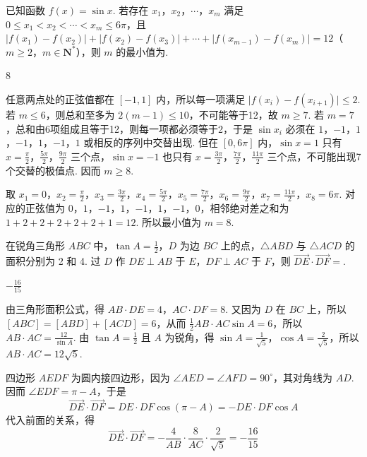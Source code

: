 \begin{problem}
已知函数 \( f(x) = \sin x \). 若存在 \(x_1\)，\(x_2\)，\(\cdots\)，\(x_m\) 满足 \( 0 \leqslant x_1 < x_2 < \cdots < x_m \leqslant 6\pi \)，且 \( |f(x_1) - f(x_2)| + |f(x_2) - f(x_3)| + \cdots + |f(x_{m-1}) - f(x_m)| = 12  \)（\(m \geqslant 2\)，\(m \in \mathbf{N}^*\)），则 \( m \) 的最小值为\fillinblank{}.
\end{problem}

\begin{answer}
8
\end{answer}

\begin{solution}
任意两点处的正弦值都在 \([-1,1]\) 内，所以每一项满足 \(\lvert f(x_i)-f(x_{i+1})\rvert\leqslant2\). 若 \(m\leqslant6\)，则总和至多为 \(2(m-1)\leqslant10\)，不可能等于12，故 \(m\geqslant7\). 若 \(m=7\)，总和由6项组成且等于12，则每一项都必须等于2，于是 \(\sin x_i\) 必须在 \(1\)，\(-1\)，\(1\)，\(-1\)，\(1\)，\(-1\)，\(1\) 或相反的序列中交替出现. 但在 \([0,6\pi]\) 内，\(\sin x=1\) 只有 \(x=\frac\pi2\)，\(\frac{5\pi}2\)，\(\frac{9\pi}2\) 三个点，\(\sin x=-1\) 也只有 \(x=\frac{3\pi}2\)，\(\frac{7\pi}2\)，\(\frac{11\pi}2\) 三个点，不可能出现7个交替的极值点. 因而 \(m\geqslant8\).

取 \(x_1=0\)，\(x_2=\frac\pi2\)，\(x_3=\frac{3\pi}2\)，\(x_4=\frac{5\pi}2\)，\(x_5=\frac{7\pi}2\)，\(x_6=\frac{9\pi}2\)，\(x_7=\frac{11\pi}2\)，\(x_8=6\pi\).
对应的正弦值为 \(0\)，\(1\)，\(-1\)，\(1\)，\(-1\)，\(1\)，\(-1\)，\(0\)，相邻绝对差之和为 \(1+2+2+2+2+2+1=12\). 所以最小值为 \(m=8\).
\end{solution}

\begin{problem}
在锐角三角形 \(ABC\) 中，\(\tan A = \frac{1}{2}\)，\(D\) 为边 \(BC\) 上的点，\(\triangle ABD\) 与 \(\triangle ACD\) 的面积分别为 2 和 4. 过 \(D\) 作 \(DE \perp AB\) 于 \(E\)，\(DF \perp AC\) 于 \(F\)，则 \(\overrightarrow{DE} \cdot \overrightarrow{DF} =\)\fillinblank{}.
\end{problem}

\begin{answer}
\(-\frac{16}{15}\)
\end{answer}

\begin{solution}
由三角形面积公式，得 \(AB\cdot DE=4\)，\(AC\cdot DF=8\).
又因为 \(D\) 在 \(BC\) 上，所以 \([ABC]=[ABD]+[ACD]=6\)，从而 \(\frac12AB\cdot AC\sin A=6\)，所以 \(AB\cdot AC=\frac{12}{\sin A}\).
由 \(\tan A=\frac12\) 且 \(A\) 为锐角，得 \(\sin A=\frac1{\sqrt5}\)，\(\cos A=\frac2{\sqrt5}\)，所以 \(AB\cdot AC=12\sqrt5\).

四边形 \(AEDF\) 为圆内接四边形，因为 \(\angle AED=\angle AFD=90^\circ\)，其对角线为 \(AD\). 因而 \(\angle EDF=\pi-A\)，于是
\[
\overrightarrow{DE}\cdot\overrightarrow{DF}=DE\cdot DF\cos(\pi-A)=-DE\cdot DF\cos A
\]
代入前面的关系，得
\[
\overrightarrow{DE}\cdot\overrightarrow{DF}=-\frac4{AB}\cdot\frac8{AC}\cdot\frac2{\sqrt5}=-\frac{16}{15}
\]
\end{solution}

